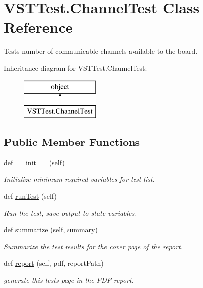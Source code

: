 \hypertarget{class_v_s_t_test_1_1_channel_test}{}\section{V\+S\+T\+Test.\+Channel\+Test Class Reference}
\label{class_v_s_t_test_1_1_channel_test}


Tests number of communicable channels available to the board.  


Inheritance diagram for V\+S\+T\+Test.\+Channel\+Test\+:\begin{figure}[H]
\begin{center}
\leavevmode
\includegraphics[height=2.000000cm]{class_v_s_t_test_1_1_channel_test}
\end{center}
\end{figure}
\subsection*{Public Member Functions}
\begin{DoxyCompactItemize}
\item 
def \hyperlink{class_v_s_t_test_1_1_channel_test_a63bf2fa1f6a019a832692102fcad7ee5}{\+\_\+\+\_\+init\+\_\+\+\_\+} (self)
\begin{DoxyCompactList}\small\item\em Initialize minimum required variables for test list. \end{DoxyCompactList}\item 
def \hyperlink{class_v_s_t_test_1_1_channel_test_a608d3ca04e5d754dd68153198d8f22a8}{run\+Test} (self)
\begin{DoxyCompactList}\small\item\em Run the test, save output to state variables. \end{DoxyCompactList}\item 
def \hyperlink{class_v_s_t_test_1_1_channel_test_a542b2fb3184ebc2a58570cabe8d558e1}{summarize} (self, summary)
\begin{DoxyCompactList}\small\item\em Summarize the test results for the cover page of the report. \end{DoxyCompactList}\item 
def \hyperlink{class_v_s_t_test_1_1_channel_test_a98fc5d455f72cafc1498e5dfc68d4328}{report} (self, pdf, report\+Path)
\begin{DoxyCompactList}\small\item\em generate this test\textquotesingle{}s page in the P\+DF report. \end{DoxyCompactList}\end{DoxyCompactItemize}


